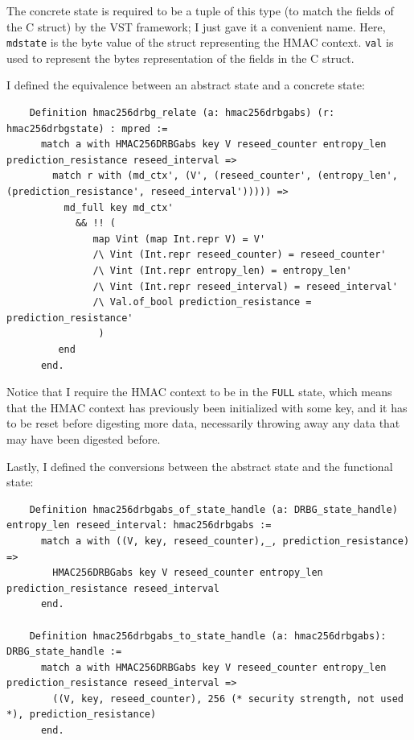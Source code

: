 \documentclass[pageno]{jpaper}
\begin{document}
The concrete state is required to be a tuple of this type (to match the fields of the C struct) by the VST framework; I just gave it a convenient name. Here, \lstinline{mdstate} is the byte value of the struct representing the HMAC context. \lstinline{val} is used to represent the bytes representation of the fields in the C struct.

I defined the equivalence between an abstract state and a concrete state:

\begin{lstlisting}
    Definition hmac256drbg_relate (a: hmac256drbgabs) (r: hmac256drbgstate) : mpred :=
      match a with HMAC256DRBGabs key V reseed_counter entropy_len prediction_resistance reseed_interval =>
        match r with (md_ctx', (V', (reseed_counter', (entropy_len', (prediction_resistance', reseed_interval'))))) =>
          md_full key md_ctx'
            && !! (
               map Vint (map Int.repr V) = V'
               /\ Vint (Int.repr reseed_counter) = reseed_counter'
               /\ Vint (Int.repr entropy_len) = entropy_len'
               /\ Vint (Int.repr reseed_interval) = reseed_interval'
               /\ Val.of_bool prediction_resistance = prediction_resistance'
                )
         end
      end.
\end{lstlisting}

Notice that I require the HMAC context to be in the \lstinline{FULL} state, which means that the HMAC context has previously been initialized with some key, and it has to be reset before digesting more data, necessarily throwing away any data that may have been digested before.

Lastly, I defined the conversions between the abstract state and the functional state:

\begin{lstlisting}
    Definition hmac256drbgabs_of_state_handle (a: DRBG_state_handle) entropy_len reseed_interval: hmac256drbgabs :=
      match a with ((V, key, reseed_counter),_, prediction_resistance) =>
        HMAC256DRBGabs key V reseed_counter entropy_len prediction_resistance reseed_interval
      end.

    Definition hmac256drbgabs_to_state_handle (a: hmac256drbgabs): DRBG_state_handle :=
      match a with HMAC256DRBGabs key V reseed_counter entropy_len prediction_resistance reseed_interval =>
        ((V, key, reseed_counter), 256 (* security strength, not used *), prediction_resistance)
      end.
\end{lstlisting}
\end{document}
